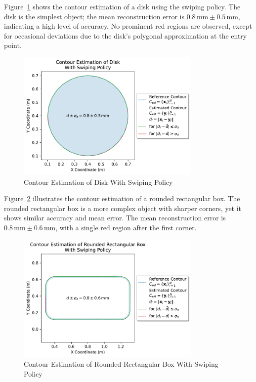 Figure~\ref{fig:experiment-disk-swiping} shows the contour estimation of a disk using the swiping policy.
The disk is the simplest object; the mean reconstruction error is $0.8\,\text{mm} \pm 0.5\,\text{mm}$, indicating a high level of accuracy.
No prominent red regions are observed, except for occasional deviations due to the disk's polygonal approximation at the entry point.

\begin{figure}[!htb]
    \centering
    \includegraphics[width=0.8\textwidth]{figures/experiments/disk-swiping}
    \caption{Contour Estimation of Disk With Swiping Policy}
    \label{fig:experiment-disk-swiping}
\end{figure}

Figure~\ref{fig:experiment-rounded-rectangular-box-swiping} illustrates the contour estimation of a rounded rectangular box.
The rounded rectangular box is a more complex object with sharper corners, yet it shows similar accuracy and mean error.
The mean reconstruction error is $0.8\,\text{mm} \pm 0.6\,\text{mm}$, with a single red region after the first corner.

\begin{figure}[!htb]
    \centering
    \includegraphics[width=0.8\textwidth]{figures/experiments/rounded-rectangular-box-swiping}
    \caption{Contour Estimation of Rounded Rectangular Box With Swiping Policy}
    \label{fig:experiment-rounded-rectangular-box-swiping}
\end{figure}

